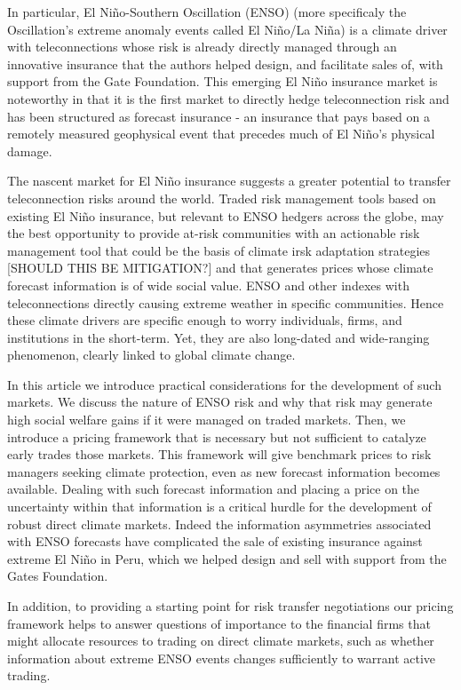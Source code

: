 \documentclass[authoryear]{article}
\begin{document}
In particular, El Ni\~no-Southern Oscillation (ENSO) (more specificaly the Oscillation's extreme anomaly events called El Ni\~no/La Ni\~na) is a climate driver with teleconnections whose risk is already directly managed through an innovative insurance that the authors helped design, and facilitate sales of, with support from the Gate Foundation. This emerging El Ni\~no insurance market is noteworthy in that it is the first market to directly hedge teleconnection risk and has been structured as forecast insurance - an insurance that pays based on a remotely measured geophysical event that precedes much of El Ni\~no's physical damage. 

The nascent market for El Ni\~no insurance suggests a greater potential to transfer teleconnection risks around the world. Traded risk management tools based on existing El Ni\~no insurance, but relevant to ENSO hedgers across the globe, may the best opportunity to provide at-risk communities with an actionable risk management tool that could be the basis of climate irsk adaptation strategies [SHOULD THIS BE MITIGATION?] and that generates prices whose climate forecast information is of wide social value. ENSO and other indexes with teleconnections directly causing extreme weather in specific communities. Hence these climate drivers are specific enough to worry individuals, firms, and institutions in the short-term. Yet, they are also long-dated and wide-ranging phenomenon, clearly linked to global climate change. 

In this article we introduce practical considerations for the development of such markets. We discuss the nature of ENSO risk and why that risk may generate high social welfare gains if it were managed on traded markets. Then, we introduce a pricing framework that is necessary but not sufficient to catalyze early trades those markets. This framework will give benchmark prices to risk managers seeking climate protection, even as new forecast information becomes available. Dealing with such forecast information and placing a price on the uncertainty within that information is a critical hurdle for the development of robust direct climate markets. Indeed the information asymmetries associated with ENSO forecasts have complicated the sale of existing insurance against extreme El Ni\~no in Peru, which we helped design and sell with support from the Gates Foundation. 

In addition, to providing a starting point for risk transfer negotiations our pricing framework helps to answer questions of importance to the financial firms that might allocate resources to trading on direct climate markets, such as whether information about extreme ENSO events changes sufficiently to warrant active trading.
\end{document}
